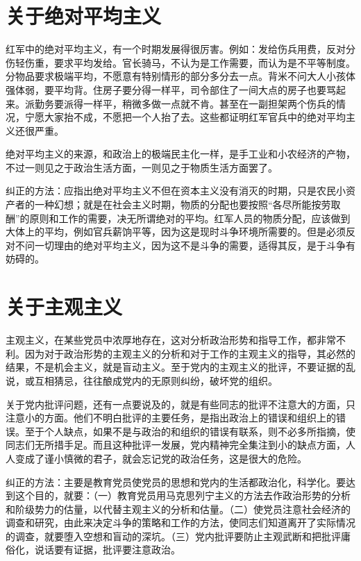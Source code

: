 \section{关于绝对平均主义}

红军中的绝对平均主义，有一个时期发展得很厉害。例如：发给伤兵用费，反对分伤轻伤重，要求平均发给。官长骑马，不认为是工作需要，而认为是不平等制度。分物品要求极端平均，不愿意有特别情形的部分多分去一点。背米不问大人小孩体强体弱，要平均背。住房子要分得一样平，司令部住了一间大点的房子也要骂起来。派勤务要派得一样平，稍微多做一点就不肯。甚至在一副担架两个伤兵的情况，宁愿大家抬不成，不愿把一个人抬了去。这些都证明红军官兵中的绝对平均主义还很严重。

绝对平均主义的来源，和政治上的极端民主化一样，是手工业和小农经济的产物，不过一则见之于政治生活方面，一则见之于物质生活方面罢了。

纠正的方法：应指出绝对平均主义不但在资本主义没有消灭的时期，只是农民小资产者的一种幻想；就是在社会主义时期，物质的分配也要按照“各尽所能按劳取酬”的原则和工作的需要，决无所谓绝对的平均。红军人员的物质分配，应该做到大体上的平均，例如官兵薪饷平等，因为这是现时斗争环境所需要的。但是必须反对不问一切理由的绝对平均主义，因为这不是斗争的需要，适得其反，是于斗争有妨碍的。

\section{关于主观主义}

主观主义，在某些党员中浓厚地存在，这对分析政治形势和指导工作，都非常不利。因为对于政治形势的主观主义的分析和对于工作的主观主义的指导，其必然的结果，不是机会主义，就是盲动主义。至于党内的主观主义的批评，不要证据的乱说，或互相猜忌，往往酿成党内的无原则纠纷，破坏党的组织。

关于党内批评问题，还有一点要说及的，就是有些同志的批评不注意大的方面，只注意小的方面。他们不明白批评的主要任务，是指出政治上的错误和组织上的错误。至于个人缺点，如果不是与政治的和组织的错误有联系，则不必多所指摘，使同志们无所措手足。而且这种批评一发展，党内精神完全集注到小的缺点方面，人人变成了谨小慎微的君子，就会忘记党的政治任务，这是很大的危险。

纠正的方法：主要是教育党员使党员的思想和党内的生活都政治化，科学化。要达到这个目的，就要：（一）教育党员用马克思列宁主义的方法去作政治形势的分析和阶级势力的估量，以代替主观主义的分析和估量。（二）使党员注意社会经济的调查和研究，由此来决定斗争的策略和工作的方法，使同志们知道离开了实际情况的调查，就要堕入空想和盲动的深坑。（三）党内批评要防止主观武断和把批评庸俗化，说话要有证据，批评要注意政治。


